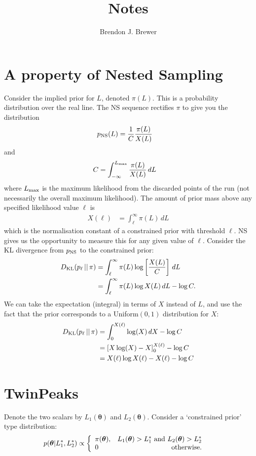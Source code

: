 \documentclass[a4paper, 12pt]{article}
\title{Notes}
\author{Brendon J. Brewer}
\date{}
\newcommand{\btheta}{\boldsymbol{\theta}}
\begin{document}
\maketitle

\setlength{\parindent}{0pt}
\setlength{\parskip}{8pt}

\section*{A property of Nested Sampling}
Consider the implied prior for $L$, denoted $\pi(L)$. This is
a probability distribution over the real line.
The NS sequence rectifies $\pi$ to give you the distribution
\begin{align}
p_{\rm NS}(L) &= \frac{1}{C} \frac{\pi(L)}{X(L)}
\end{align}
and
\begin{align}
C &= \int_{-\infty}^{L_{\rm max}} \frac{\pi(L)}{X(L)} \, dL
\end{align}
where $L_{\rm max}$ is the maximum likelihood from the
discarded points of the run
(not necessarily the overall maximum likelihood).
The amount of prior mass above any specified likelihood value
$\ell$ is
\begin{align}
X(\ell) &= \int_{\ell}^{\infty} \pi(L) \, dL 
\end{align}
which is the normalisation constant of a constrained prior with
threshold $\ell$.
NS gives us the opportunity to measure this for any given
value of $\ell$. Consider the KL divergence from $p_{\rm NS}$ to
the constrained prior:
\begin{align}
D_{\rm KL}(p_\ell \,||\, \pi)
  &= \int_{\ell}^{\infty} \pi(L)
           \log\left[\frac{X(L)}{C}\right] \, dL \\
  &= \int_{\ell}^{\infty} \pi(L)\log X(L) \, dL - \log C.
\end{align}
We can take the expectation (integral) in terms of $X$ instead of
$L$, and use the fact that the prior corresponds to a
Uniform$(0,1)$ distribution for $X$:
\begin{align}
D_{\rm KL}(p_\ell \,||\, \pi)
  &= \int_0^{X(\ell)} \log(X) \, dX - \log C \\
  &= \left[X\log(X) - X\right]_0^{X(\ell)} - \log C \\
  &= X(\ell)\log X(\ell) - X(\ell) - \log C
\end{align}



\section*{TwinPeaks}
Denote the two scalars by $L_1(\btheta)$ and $L_2(\btheta)$.
Consider a `constrained prior' type distribution:
\begin{align}
p(\btheta | L_1^*, L_2^*) &\propto
    \left\{
        \begin{array}{lr}
            \pi(\btheta), & L_1(\btheta) > L_1^* \textnormal{ and }
                            L_2(\btheta) > L_2^* \\
            0             & \textnormal{otherwise}.
        \end{array}
    \right.
\end{align}

\end{document}

